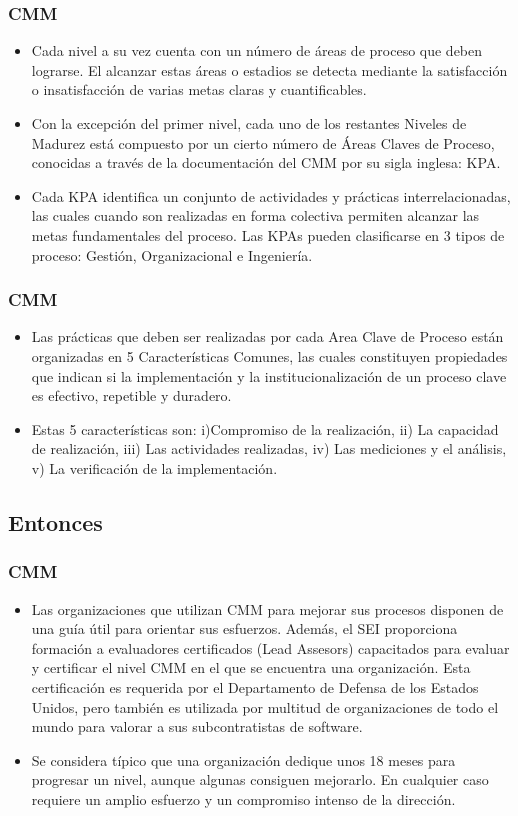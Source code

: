 \documentclass{beamer}
\begin{document}
\frame
{
	\frametitle{CMM}
	\begin{itemize}
	    \item<1-> Cada nivel a su vez cuenta con un número de áreas
de proceso que deben lograrse. El alcanzar estas áreas o estadios se detecta
mediante la satisfacción o insatisfacción de varias metas claras y cuantificables. 

		\item<2-> Con la excepción del primer nivel, cada uno de los restantes Niveles de Madurez está
compuesto por un cierto número de Áreas Claves de Proceso, conocidas a través de
la documentación del CMM por su sigla inglesa: KPA.


    	\item<3-> Cada KPA identifica un conjunto de actividades y prácticas interrelacionadas, las
cuales cuando son realizadas en forma colectiva permiten alcanzar las metas
fundamentales del proceso. Las KPAs pueden clasificarse en 3 tipos de proceso:
Gestión, Organizacional e Ingeniería.
	\end{itemize}
}

\frame
{
  \frametitle{CMM}
  \begin{itemize}
    \item<1-> Las prácticas que deben ser realizadas por cada Area Clave de Proceso están organizadas en {\Large 5 Características Comunes}, las cuales constituyen propiedades que indican si la implementación y la institucionalización de un proceso clave es efectivo, repetible y duradero.

    \item<2-> Estas 5 características son: i)Compromiso de la realización, ii) La capacidad de realización, iii) Las actividades realizadas, iv) Las mediciones y el análisis, v) La verificación de la implementación.

  \end{itemize}
}

\subsection{Entonces}

\frame
{
  \frametitle{CMM}
  \begin{itemize}
    \item<1-> Las organizaciones que utilizan CMM para mejorar sus procesos disponen de una guía útil para orientar sus esfuerzos. Además, el SEI proporciona formación a evaluadores certificados (Lead Assesors) capacitados para evaluar y certificar el nivel CMM en el que se encuentra una organización. Esta certificación es requerida por el Departamento de Defensa de los Estados Unidos, pero también es utilizada por multitud de organizaciones de todo el mundo para valorar a sus subcontratistas de software.
    \item<2-> Se considera típico que una organización dedique unos 18 meses para progresar un nivel, aunque algunas consiguen mejorarlo. En cualquier caso requiere un amplio esfuerzo y un compromiso intenso de {\Large la dirección.}
  \end{itemize}
}
\end{document}

